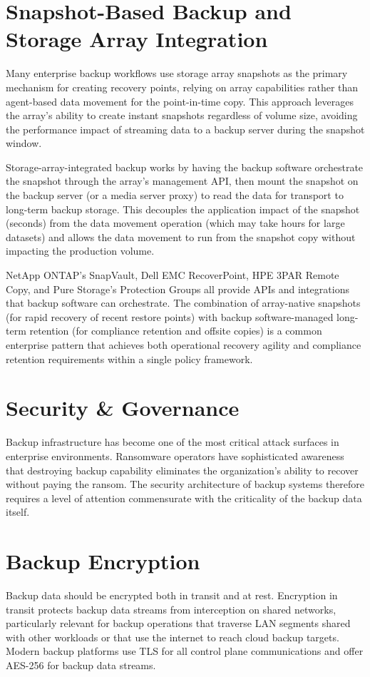 \section{Snapshot-Based Backup and Storage Array Integration}
Many enterprise backup workflows use storage array snapshots as the primary mechanism for creating recovery points, relying on array capabilities rather than agent-based data movement for the point-in-time copy. This approach leverages the array's ability to create instant snapshots regardless of volume size, avoiding the performance impact of streaming data to a backup server during the snapshot window.

Storage-array-integrated backup works by having the backup software orchestrate the snapshot through the array's management API, then mount the snapshot on the backup server (or a media server proxy) to read the data for transport to long-term backup storage. This decouples the application impact of the snapshot (seconds) from the data movement operation (which may take hours for large datasets) and allows the data movement to run from the snapshot copy without impacting the production volume.

NetApp ONTAP's SnapVault, Dell EMC RecoverPoint, HPE 3PAR Remote Copy, and Pure Storage's Protection Groups all provide APIs and integrations that backup software can orchestrate. The combination of array-native snapshots (for rapid recovery of recent restore points) with backup software-managed long-term retention (for compliance retention and offsite copies) is a common enterprise pattern that achieves both operational recovery agility and compliance retention requirements within a single policy framework.

\section{Security \& Governance}
Backup infrastructure has become one of the most critical attack surfaces in enterprise environments. Ransomware operators have sophisticated awareness that destroying backup capability eliminates the organization's ability to recover without paying the ransom. The security architecture of backup systems therefore requires a level of attention commensurate with the criticality of the backup data itself.

\section{Backup Encryption}
Backup data should be encrypted both in transit and at rest. Encryption in transit protects backup data streams from interception on shared networks, particularly relevant for backup operations that traverse LAN segments shared with other workloads or that use the internet to reach cloud backup targets. Modern backup platforms use TLS for all control plane communications and offer AES-256 for backup data streams.

